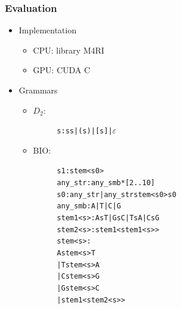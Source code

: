 \documentclass[xcolor=table]{beamer}
\begin{document}
\begin{frame}[fragile] \frametitle{Evaluation}
    \begin{itemize}
        \item Implementation
        \begin{itemize}
            \item CPU: library M4RI
            \item GPU: CUDA C
        \end{itemize}
        \item Grammars
        \begin{itemize}
            \item $D_2$:
            \vspace{-12pt}
            \begin{figure}[t]
            \begin{minipage}{0.4\textwidth}
            \small
            \begin{alltt}
s: s s | ( s ) | [ s ] | \(\varepsilon \)
            \end{alltt}
            \end{minipage}
            \end{figure}

            \item BIO:
            \vspace{-12pt}
            \begin{figure}[t]
            \begin{minipage}{0.4\textwidth}
            \small
            \begin{alltt}
s1: stem<s0>
any_str: any_smb*[2..10]
s0: any_str | any_str stem<s0> s0
any_smb: A | T | C | G
stem1<s>: A s T | G s C | T s A | C s G 
stem2<s>: stem1<stem1<s>>
stem<s>:  
      A stem<s> T 
    | T stem<s> A 
    | C stem<s> G 
    | G stem<s> C 
    | stem1<stem2<s>>              
            \end{alltt}
            \end{minipage}
            \end{figure}

        \end{itemize}
        
    \end{itemize}

\end{frame}
\end{document}
